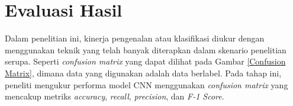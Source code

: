  

\section{Evaluasi Hasil}

    Dalam penelitian ini, kinerja pengenalan atau klasifikasi diukur dengan menggunakan teknik yang telah banyak diterapkan dalam skenario penelitian serupa. Seperti \textit{confusion matrix} yang dapat dilihat pada Gambar \ref{Confusion Matrix}, dimana data yang digunakan adalah data berlabel. Pada tahap ini, peneliti mengukur performa model CNN menggunakan \textit{confusion matrix} yang mencakup metriks \textit{accuracy}, \textit{recall},\textit{ precision}, dan \textit{F-1 Score}.


